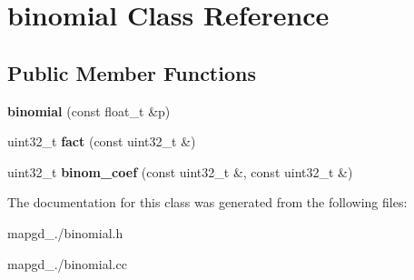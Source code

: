 \hypertarget{classbinomial}{\section{binomial Class Reference}
\label{classbinomial}
}
\subsection*{Public Member Functions}
\begin{DoxyCompactItemize}
\item 
\hypertarget{classbinomial_add79fb768a6efc4b4fb943687e34f99e}{{\bfseries binomial} (const float\-\_\-t \&p)}\label{classbinomial_add79fb768a6efc4b4fb943687e34f99e}

\item 
\hypertarget{classbinomial_aba6c2cff03e17edaa79ac38beba97df8}{uint32\-\_\-t {\bfseries fact} (const uint32\-\_\-t \&)}\label{classbinomial_aba6c2cff03e17edaa79ac38beba97df8}

\item 
\hypertarget{classbinomial_a829c87611cdd314ef3bdac88133c0d80}{uint32\-\_\-t {\bfseries binom\-\_\-coef} (const uint32\-\_\-t \&, const uint32\-\_\-t \&)}\label{classbinomial_a829c87611cdd314ef3bdac88133c0d80}

\end{DoxyCompactItemize}


The documentation for this class was generated from the following files\-:\begin{DoxyCompactItemize}
\item 
mapgd\-\_./binomial.\-h\item 
mapgd\-\_./binomial.\-cc\end{DoxyCompactItemize}
